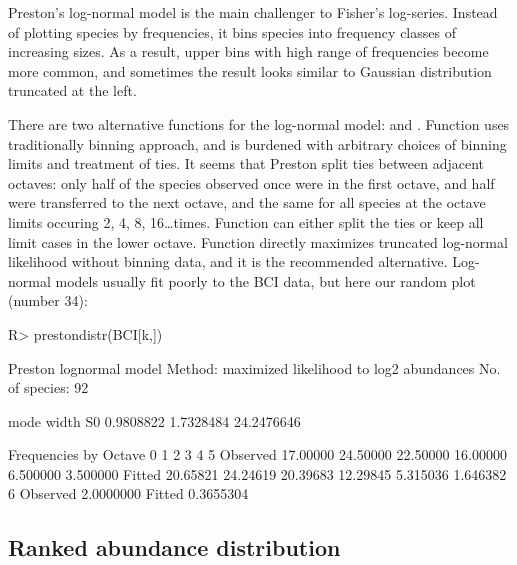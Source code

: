 \documentclass[article,nojss]{jss}
\begin{document}
Preston's log-normal model is the main challenger to Fisher's
log-series.  Instead of plotting species by frequencies, it bins
species into frequency classes of increasing sizes.  As a result,
upper bins with high range of frequencies become more common, and
sometimes the result looks similar to Gaussian distribution truncated
at the left.

There are two alternative functions for the log-normal model:
 and .  Function
 uses traditionally binning approach, and is burdened
with arbitrary choices of binning limits and treatment of ties. It
seems that Preston split ties between adjacent octaves: only half of
the species observed once were in the first octave, and half were
transferred to the next octave, and the same for all species at the
octave limits occuring 2, 4, 8, 16\ldots times. Function
 can either split the ties or keep all limit cases in
the lower octave.
Function  directly
maximizes truncated log-normal likelihood without binning data, and it
is the recommended alternative.  Log-normal models  usually fit poorly
to the BCI data, but here our random plot (number 34):
\begin{Schunk}
\begin{Sinput}
R> prestondistr(BCI[k,])
\end{Sinput}
\begin{Soutput}
Preston lognormal model
Method: maximized likelihood to log2 abundances 
No. of species: 92 

      mode      width         S0 
 0.9808822  1.7328484 24.2476646 

Frequencies by Octave
                0        1        2        3        4        5
Observed 17.00000 24.50000 22.50000 16.00000 6.500000 3.500000
Fitted   20.65821 24.24619 20.39683 12.29845 5.315036 1.646382
                 6
Observed 2.0000000
Fitted   0.3655304
\end{Soutput}
\end{Schunk}

\subsection{Ranked abundance distribution}
\end{document}
